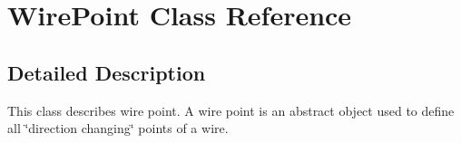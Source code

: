 \hypertarget{class_wire_point}{}\section{Wire\+Point Class Reference}
\label{class_wire_point}


\subsection{Detailed Description}
This class describes wire point. A wire point is an abstract object used to define all \char`\"{}direction changing\char`\"{} points of a wire. 